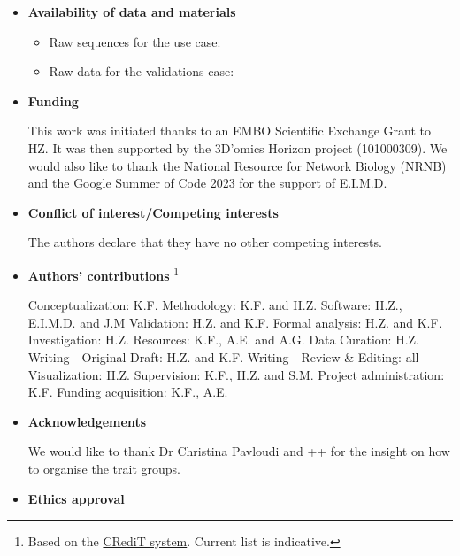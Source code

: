 \documentclass[sn-mathphys,Numbered, lineno]{sn-jnl}  %
\theoremstyle{thmstyleone}%
\theoremstyle{thmstyletwo}%
\theoremstyle{thmstylethree}%
\begin{document}
    \begin{itemize}

        \item \textbf{Availability of data and materials}

            \begin{itemize}
                \item Raw sequences for the use case: 
                \item Raw data for the validations case:
            \end{itemize}

        \item \textbf{Funding}
        
            This work was initiated thanks to an EMBO Scientific Exchange Grant to HZ. 
            It was then supported by the 3D’omics Horizon project (101000309). 
            We would also like to thank the National Resource for Network Biology (NRNB) and the Google Summer of Code 2023 for the support of E.I.M.D.

        \item \textbf{Conflict of interest/Competing interests} 

            The authors declare that they have no other competing interests.

        \item \textbf{Authors' contributions}
            \footnote{Based on the \href{https://www-elsevier-com.kuleuven.e-bronnen.be/researcher/author/policies-and-guidelines/credit-author-statement}{CRediT system}. Current list is indicative.}

            Conceptualization: K.F.
            Methodology: K.F. and H.Z.
            Software: H.Z., E.I.M.D. and J.M
            Validation: H.Z. and K.F.
            Formal analysis: H.Z. and K.F.
            Investigation: H.Z.
            Resources: K.F., A.E. and A.G.
            Data Curation: H.Z.
            Writing - Original Draft: H.Z. and K.F. 
            Writing - Review \& Editing: all
            Visualization: H.Z.
            Supervision: K.F., H.Z. and S.M.
            Project administration: K.F.
            Funding acquisition: K.F., A.E.


        \item \textbf{Acknowledgements}

            We would like to thank Dr Christina Pavloudi and ++ for the insight on how to organise the trait groups.


        \item \textbf{Ethics approval}


\end{itemize}
\end{document}
